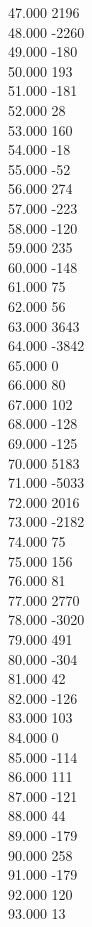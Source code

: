 { 47.000	2196 \\
 48.000	-2260 \\
 49.000	-180 \\
 50.000	193 \\
 51.000	-181 \\
 52.000	28 \\
 53.000	160 \\
 54.000	-18 \\
 55.000	-52 \\
 56.000	274 \\
 57.000	-223 \\
 58.000	-120 \\
 59.000	235 \\
 60.000	-148 \\
 61.000	75 \\
 62.000	56 \\
 63.000	3643 \\
 64.000	-3842 \\
 65.000	0 \\
 66.000	80 \\
 67.000	102 \\
 68.000	-128 \\
 69.000	-125 \\
 70.000	5183 \\
 71.000	-5033 \\
 72.000	2016 \\
 73.000	-2182 \\
 74.000	75 \\
 75.000	156 \\
 76.000	81 \\
 77.000	2770 \\
 78.000	-3020 \\
 79.000	491 \\
 80.000	-304 \\
 81.000	42 \\
 82.000	-126 \\
 83.000	103 \\
 84.000	0 \\
 85.000	-114 \\
 86.000	111 \\
 87.000	-121 \\
 88.000	44 \\
 89.000	-179 \\
 90.000	258 \\
 91.000	-179 \\
 92.000	120 \\
 93.000	13 \\
}
